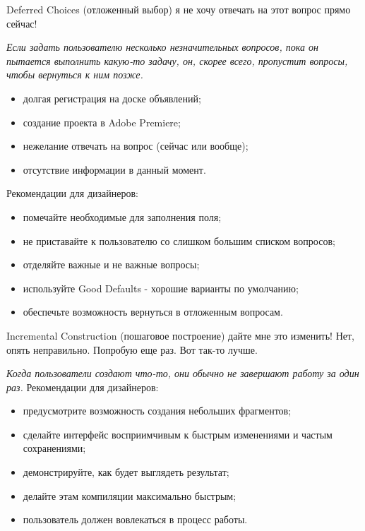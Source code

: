 \documentclass{beamer}
\begin{document}
\begin{frame}[t]	
	\begin{block}{Deferred Choices (отложенный выбор)}
		 я не хочу отвечать на этот вопрос прямо сейчас!
	\end{block}	
	\textit{Если задать пользователю несколько незначительных вопросов, пока он пытается выполнить какую-то задачу, он, скорее всего, пропустит вопросы, чтобы вернуться к ним позже.}
	\begin{itemize}
		\item долгая регистрация на доске объявлений;
		\item создание проекта в Adobe Premiere;		
		\item нежелание отвечать на вопрос (сейчас или вообще);				
		\item отсутствие информации в данный момент.		
	\end{itemize}		
	Рекомендации для дизайнеров:
	\begin{itemize}
		\item помечайте необходимые для заполнения поля;	
		\item не приставайте к пользователю со слишком большим списком вопросов;
		\item отделяйте важные и не	важные вопросы;
		\item используйте Good Defaults - хорошие варианты по умолчанию;
		\item обеспечьте возможность вернуться в отложенным вопросам.						
	\end{itemize}	
\end{frame}

\begin{frame}[t]	
	\begin{block}{Incremental Construction (пошаговое построение)}
		 дайте мне это изменить! Нет, опять неправильно. Попробую еще раз. Вот так-то лучше.
	\end{block}	
	\textit{Когда пользователи создают что-то, они обычно не завершают работу за один раз.}
	Рекомендации для дизайнеров:
	\begin{itemize}
		\item предусмотрите возможность создания небольших фрагментов;
		\item сделайте интерфейс восприимчивым к быстрым изменениями и частым сохранениями;		
		\item демонстрируйте, как будет выглядеть результат;		
		\item делайте этам компиляции максимально быстрым;		
		\item пользователь должен вовлекаться в процесс работы.		
	\end{itemize}	
\end{frame}
\end{document}
